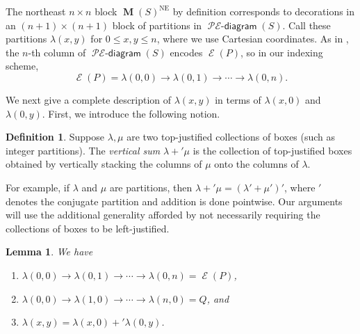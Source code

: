 \documentclass{amsart}
\newtheorem{lemma}[theorem]{Lemma}
\theoremstyle{definition}
\newtheorem{definition}[theorem]{Definition}
\DeclareMathOperator{\NE}{NE}
\DeclareMathOperator{\evacuation}{\mathcal{E}}
\DeclareMathOperator{\PEdiagram}{\mathcal{P}\mathcal{E}-\mathsf{diagram}}
\DeclareMathOperator{\PM}{\mathbf{M}}
\newcommand{\vsum}{+'}
\begin{document}
The northeast $n \times n$ block $\PM(S)^{\NE}$ by definition corresponds to decorations in an $(n+1) \times (n+1)$ block of partitions in $\PEdiagram(S)$. Call these partitions $\lambda(x, y)$ for $0 \leq x, y \leq n$, where we use Cartesian coordinates. As  in , the $n$-th column of $\PEdiagram(S)$ encodes $\evacuation(P)$, so in our indexing scheme,
  \[ \evacuation(P) = \lambda(0, 0) \to \lambda(0, 1) \to \cdots \to \lambda(0, n). \]

We next give a complete description of $\lambda(x, y)$ in terms of $\lambda(x, 0)$ and $\lambda(0, y)$. First, we introduce the following notion.

\begin{definition}
    Suppose $\lambda, \mu$ are two top-justified collections of boxes (such as integer partitions). The \emph{vertical sum} $\lambda \vsum \mu$ is the collection of top-justified boxes obtained by vertically stacking the columns of $\mu$ onto the columns of $\lambda$.
\end{definition}

For example, if $\lambda$ and $\mu$ are partitions, then $\lambda \vsum \mu = (\lambda' + \mu')'$, where $'$ denotes the conjugate partition and addition is done pointwise. Our arguments will use the additional generality afforded by not necessarily requiring the collections of boxes to be left-justified.

\begin{lemma}\label{lem:proof-vsum}
    We have
    \begin{enumerate}
        \item $\lambda(0,0) \to \lambda(0,1) \to \cdots \to \lambda(0,n) = \evacuation(P)$,
        \item $\lambda(0,0) \to \lambda(1,0) \to \cdots \to \lambda(n,0) = Q$, and
        \item $\lambda(x,y) = \lambda(x,0) \vsum \lambda(0,y)$.
    \end{enumerate}
\end{lemma}
\end{document}
